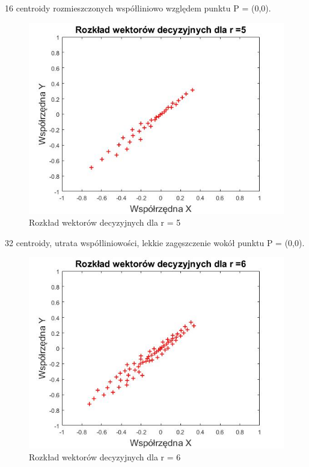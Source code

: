 \documentclass[12pt, a4paper, oneside]{article}
\begin{document}
\begin{center}
16 centroidy rozmieszczonych współliniowo względem punktu P = (0,0).
\end{center}
\clearpage
\begin{figure}[h!]
\centering
\caption{Rozkład wektorów decyzyjnych dla r = 5}
\includegraphics[scale=0.65]{pics/f5}
\end{figure}
\begin{center}
32 centroidy, utrata współliniowości, lekkie zagęszczenie wokół punktu P = (0,0).
\end{center}
\begin{figure}[h!]
\centering
\caption{Rozkład wektorów decyzyjnych dla r = 6}
\includegraphics[scale=0.65]{pics/f6}
\end{figure}
\end{document}
